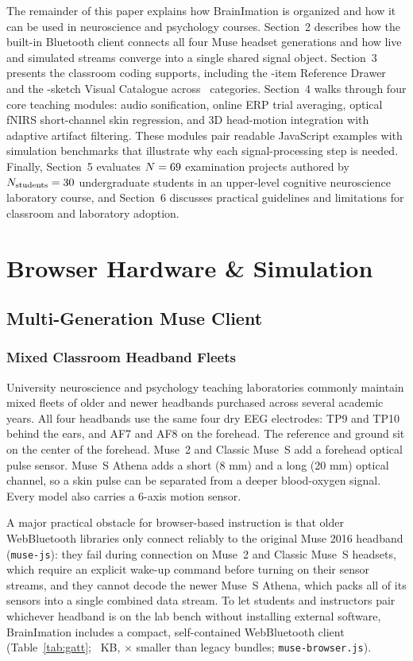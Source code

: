 \documentclass[11pt]{article}
\begin{document}
The remainder of this paper explains how BrainImation is organized and how it can be used in neuroscience and psychology courses. Section~2 describes how the built-in Bluetooth client connects all four Muse headset generations and how live and simulated streams converge into a single shared signal object. Section~3 presents the classroom coding supports, including the \NRefAPIs-item Reference Drawer and the \NCatalogueSketches-sketch Visual Catalogue across \NCatalogueCategories\ categories. Section~4 walks through four core teaching modules: audio sonification, online ERP trial averaging, optical fNIRS short-channel skin regression, and 3D head-motion integration with adaptive artifact filtering. These modules pair readable JavaScript examples with simulation benchmarks that illustrate why each signal-processing step is needed. Finally, Section~5 evaluates $N = 69$ examination projects authored by $N_{\text{students}} = 30$ undergraduate students in an upper-level cognitive neuroscience laboratory course, and Section~6 discusses practical guidelines and limitations for classroom and laboratory adoption.

\section{Browser Hardware \& Simulation}

\subsection{Multi-Generation Muse Client}

\subsubsection{Mixed Classroom Headband Fleets}
University neuroscience and psychology teaching laboratories commonly maintain mixed fleets of older and newer headbands purchased across several academic years. All four headbands use the same four dry EEG electrodes: TP9 and TP10 behind the ears, and AF7 and AF8 on the forehead. The reference and ground sit on the center of the forehead. Muse~2 and Classic Muse~S add a forehead optical pulse sensor. Muse~S Athena adds a short (8 mm) and a long (20 mm) optical channel, so a skin pulse can be separated from a deeper blood-oxygen signal. Every model also carries a 6-axis motion sensor.

A major practical obstacle for browser-based instruction is that older WebBluetooth libraries only connect reliably to the original Muse 2016 headband (\texttt{muse-js}): they fail during connection on Muse~2 and Classic Muse~S headsets, which require an explicit wake-up command before turning on their sensor streams, and they cannot decode the newer Muse~S Athena, which packs all of its sensors into a single combined data stream. To let students and instructors pair whichever headband is on the lab bench without installing external software, BrainImation includes a compact, self-contained WebBluetooth client (Table~\ref{tab:gatt}; \MuseBrowserKB~KB, \BundleReductionFactor$\times$ smaller than legacy bundles; \texttt{muse-browser.js}).
\end{document}
